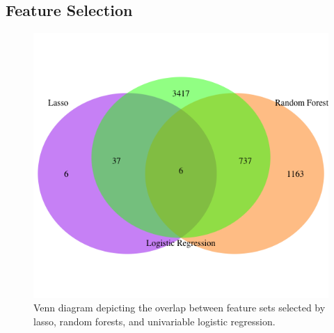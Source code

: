 \documentclass[a4paper]{article}
\begin{document}
\subsection{Feature Selection}
\begin{figure}[h!]
	\centering
	\includegraphics[scale=0.40]{venn.png}
	\caption{Venn diagram depicting the overlap between feature sets selected by lasso, random forests, and univariable logistic regression.}
	\label{fig:venn}
\end{figure}
\end{document}
